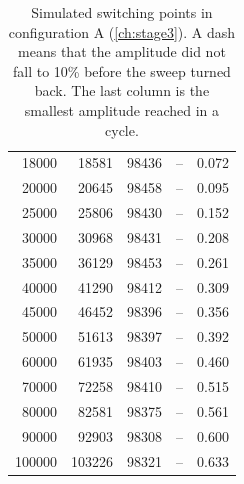 \begin{table}[p]
\begin{tabular}{@{}rrrrr@{}}
18000 & 18581 & 98436 & -- & 0.072 \\
20000 & 20645 & 98458 & -- & 0.095 \\
25000 & 25806 & 98430 & -- & 0.152 \\
30000 & 30968 & 98431 & -- & 0.208 \\
35000 & 36129 & 98453 & -- & 0.261 \\
40000 & 41290 & 98412 & -- & 0.309 \\
45000 & 46452 & 98396 & -- & 0.356 \\
50000 & 51613 & 98397 & -- & 0.392 \\
60000 & 61935 & 98403 & -- & 0.460 \\
70000 & 72258 & 98410 & -- & 0.515 \\
80000 & 82581 & 98375 & -- & 0.561 \\
90000 & 92903 & 98308 & -- & 0.600 \\
100000 & 103226 & 98321 & -- & 0.633 \\
\bottomrule
\end{tabular}
\caption[Simulated switching points, configuration A]{Simulated switching points in configuration A
(\cref{ch:stage3}). A dash means that the amplitude did not fall to 10\% before the sweep turned back.
The last column is the smallest amplitude reached in a cycle.}
\label{tab:appB-sim}
\end{table}
